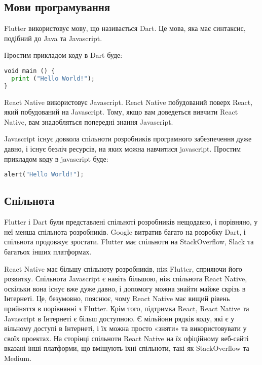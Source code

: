 \subsection{Мови програмування}
\label{subsec:languages}

Flutter використовує мову, що називається Dart.
Це мова, яка має синтаксис, подібний до Java та Javascript.

Простим прикладом коду в Dart буде:
\begin{lstlisting}[style=light, language=Python,label={lst:vectorimg},caption=Dart Hello World]
void main () { 
  print ("Hello World!"); 
}
\end{lstlisting}

React Native використовує Javascript.
React Native побудований поверх React, який побудований на Javascript.
Тому, якщо вам доведеться вивчити React Native, вам знадобляться попередні знання Javascript.

Javascript існує довкола спільноти розробників програмного забезпечення дуже давно, і існує безліч ресурсів, на яких можна навчитися javascript.
Простим прикладом коду в javascript буде:

\begin{lstlisting}[style=light, language=Python,label={lst:vectorimg},caption=Dart Hello World]
  alert("Hello World!");
\end{lstlisting}

\subsection{Спільнота}
\label{subsec:communities}

Flutter і Dart були представлені спільноті розробників нещодавно, і порівняно, у неї менша спільнота розробників.
Google витратив багато на розробку Dart, і спільнота продовжує зростати.
Flutter має спільноти на StackOverflow, Slack та багатьох інших платформах.

React Native має більшу спільноту розробників, ніж Flutter, сприяючи його розвитку.
Спільнота Javascript є навіть більшою, ніж спільнота React Native, оскільки вона існує вже дуже давно, і допомогу можна знайти майже скрізь в Інтернеті.
Це, безумовно, пояснює, чому React Native має вищий рівень прийняття в порівнянні з Flutter.
Крім того, підтримка React, React Native та Javascript в Інтернеті є більш доступною.
Є мільйони рядків коду, які є у вільному доступі в Інтернеті, і їх можна просто «зняти» та використовувати у своїх проектах.
На сторінці спільноти React Native на їх офіційному веб-сайті вказані інші платформи, що вміщують їхні спільноти, такі як StackOverflow та Medium.


